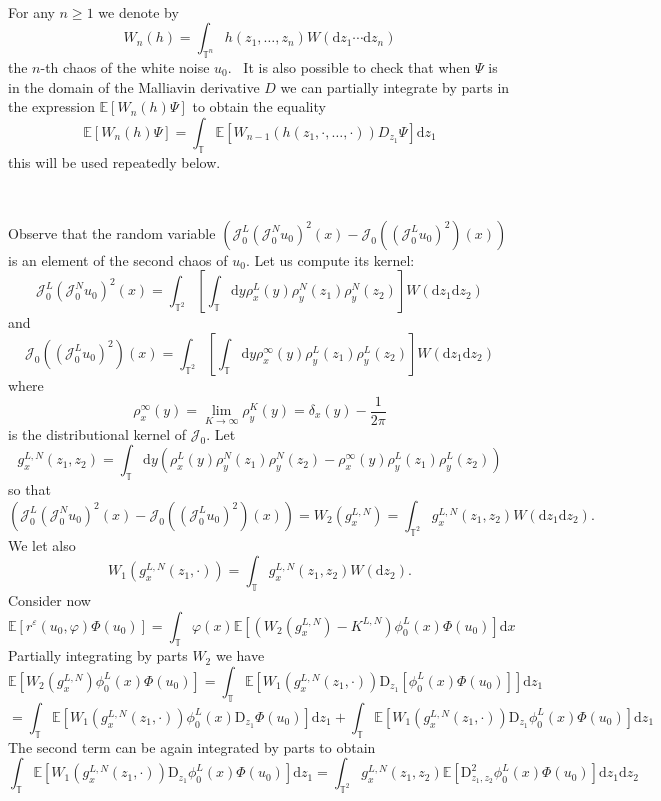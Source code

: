 \documentclass[a4paper,11pt]{article}
\newcommand{\mathD}{\mathrm{D}}
\newcommand{\mathd}{\mathrm{d}}
\newcommand{\JJ}{\mathcal{J}}
\begin{document}
\

For any $n \geqslant 1$ we denote by
\[ W_n (h) = \int_{\mathbb{T}^n} h (z_1, \ldots, z_n) W (\mathd z_1 \cdots
   \mathd z_n) \]
the $n$-th chaos of the white noise $u_0$. \ It is also possible to check that
when $\Psi$ is in the domain of the Malliavin derivative $D$ we can partially
integrate by parts in the expression $\mathbb{E} [W_n (h) \Psi]$ to obtain
the equality
\[ \mathbb{E} [W_n (h) \Psi] = \int_{\mathbb{T}} \mathbb{E} [W_{n - 1} (h
   (z_1, \cdot, \ldots, \cdot)) D_{z_1} \Psi] \mathd z_1 \]
this will be used repeatedly below.

\

Observe that the random variable $(\JJ^L_0 \left( \JJ^N_0 u_0 \right)^2 (x) -
\JJ_0 \left( (\JJ^L_0 u_0)^2 \right) (x))$ is an element of the second chaos
of $u_0$. Let us compute its kernel:
\[ \JJ^L_0 \left( \JJ^N_0 u_0 \right)^2 (x) = \int_{\mathbb{T}^2} \left[
   \int_{\mathbb{T}} \mathd y \rho_x^L (y) \rho^N_y (z_1) \rho^N_y (z_2)
   \right] W (\mathd z_1 \mathd z_2) \]
and
\[ \JJ_0 \left( (\JJ^L_0 u_0)^2 \right) (x) = \int_{\mathbb{T}^2} \left[
   \int_{\mathbb{T}} \mathd y \rho_x^{\infty} (y) \rho^L_y (z_1) \rho^L_y
   (z_2) \right] W (\mathd z_1 \mathd z_2) \]
where
\[ \rho_x^{\infty} (y) = \lim_{K \rightarrow \infty} \rho^K_y (y) = \delta_x
   (y) - \frac{1}{2 \pi} \]
is the distributional kernel of $\JJ_0$. Let
\[ g_x^{L, N} (z_1, z_2) = \int_{\mathbb{T}} \mathd y (\rho_x^L (y) \rho^N_y
   (z_1) \rho^N_y (z_2) - \rho_x^{\infty} (y) \rho^L_y (z_1) \rho^L_y (z_2))
\]
so that
\[ (\JJ^L_0 \left( \JJ^N_0 u_0 \right)^2 (x) - \JJ_0 \left( (\JJ^L_0 u_0)^2
   \right) (x)) = W_2 (g_x^{L, N}) = \int_{\mathbb{T}^2} g_x^{L, N} (z_1,
   z_2) W (\mathd z_1 \mathd z_2) . \]
We let also
\[ W_1 (g_x^{L, N} (z_1, \cdot)) = \int_{\mathbb{T}} g_x^{L, N} (z_1, z_2) W
   (\mathd z_2) . \]
Consider now
\[ \mathbb{E} [r^{\varepsilon} (u_0, \varphi) \Phi (u_0)] =
   \int_{\mathbb{T}} \varphi (x) \mathbb{E} [(W_2 (g_x^{L, N}) - K^{L, N})
   \phi_0^L (x) \Phi (u_0)] \mathd x \]
Partially integrating by parts $W_2$ we have
\[ \mathbb{E} [W_2 (g_x^{L, N}) \phi_0^L (x) \Phi (u_0)] = \int_{\mathbb{T}}
   \mathbb{E} [W_1 (g_x^{L, N} (z_1, \cdot)) \mathD_{z_1} [\phi_0^L (x) \Phi
   (u_0)]] \mathd z_1 \]
\[ = \int_{\mathbb{T}} \mathbb{E} [W_1 (g_x^{L, N} (z_1, \cdot)) \phi_0^L
   (x) \mathD_{z_1} \Phi (u_0)] \mathd z_1 + \int_{\mathbb{T}} \mathbb{E}
   [W_1 (g_x^{L, N} (z_1, \cdot)) \mathD_{z_1} \phi_0^L (x) \Phi (u_0)] \mathd
   z_1 \]
The second term can be again integrated by parts to obtain
\[ \int_{\mathbb{T}} \mathbb{E} [W_1 (g_x^{L, N} (z_1, \cdot)) \mathD_{z_1}
   \phi_0^L (x) \Phi (u_0)] \mathd z_1 = \int_{\mathbb{T}^2} g_x^{L, N} (z_1,
   z_2) \mathbb{E} [\mathD_{z_1, z_2}^2 \phi_0^L (x) \Phi (u_0)] \mathd z_1
   \mathd z_2 \]
\end{document}

